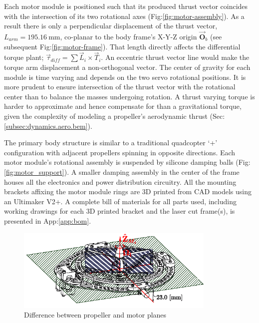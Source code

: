 Each motor module is positioned such that its produced thrust vector coincides with the intersection of its two rotational axes (Fig:\ref{fig:motor-assembly}). As a result there is only a perpendicular displacement of the thrust vector, $L_{arm}=195.16~\text{mm}$, co-planar to the body frame's X-Y-Z origin $\vec{\mathbf{O}}_b$ (see subsequent Fig:\ref{fig:motor-frame}). That length directly affects the differential torque plant; $\vec{\tau}_{diff}=\sum\vec{L}_i\times\vec{T}_i$. An eccentric thrust vector line would make the torque arm displacement a non-orthogonal vector. The center of gravity for each module is time varying and depends on the two servo rotational positions. It is more prudent to ensure intersection of the thrust vector with the rotational center than to balance the masses undergoing rotation. A thrust varying torque is harder to approximate and hence compensate for than a gravitational torque, given the complexity of modeling a propeller's aerodynamic thrust (Sec:\ref{subsec:dynamics.aero.bem}).
\par
The primary body structure is similar to a traditional quadcopter `+' configuration with adjacent propellers spinning in opposite directions. Each motor module's rotational assembly is suspended by silicone damping balls (Fig:\ref{fig:motor_support}). A smaller damping assembly in the center of the frame houses all the electronics and power distribution circuitry. All the mounting brackets affixing the motor module rings are 3D printed from CAD models using an Ultimaker V2+\cite{ultimaker}. A complete bill of materials for all parts used, including working drawings for each 3D printed bracket and the laser cut frame(s), is presented in App:\ref{app:bom}.
\par
\begin{figure}[hbtp]
\centering
\includegraphics[width=0.85\textwidth]{figs/motor-prop}
\vspace{-10pt}
\caption{Difference between propeller and motor planes}
\label{fig:motor_prop}
\vspace{-15pt}
\end{figure}
